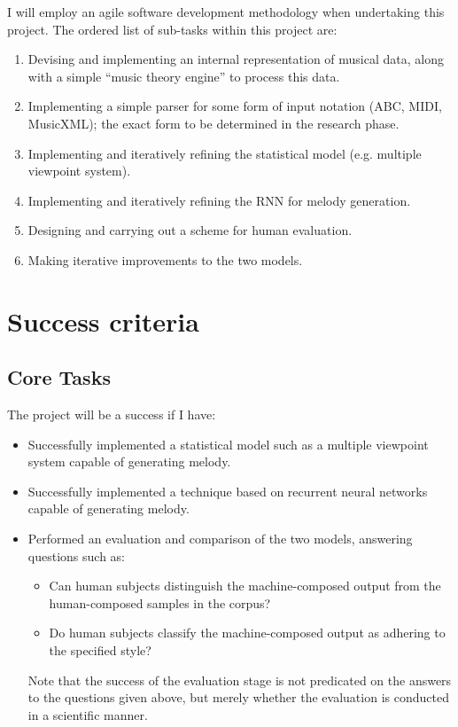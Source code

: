 \documentclass[12pt,a4paper,twoside]{article}
\begin{document}
I will employ an agile software development methodology when undertaking this
project. The ordered list of sub-tasks within this project are:
\begin{enumerate}

\item Devising and implementing an internal representation of musical data,
	along with a simple ``music theory engine'' to process this data.  

\item Implementing a simple parser for some form of input notation (ABC, MIDI,
	MusicXML); the exact form to be determined in the research phase.  

\item Implementing and iteratively refining the statistical model (e.g. multiple
	viewpoint system).

\item Implementing and iteratively refining the RNN for melody generation.  

\item Designing and carrying out a scheme for human evaluation.

\item Making iterative improvements to the two models.

\end{enumerate}

\section*{Success criteria}

\subsection*{Core Tasks}

The project will be a success if I have:
\begin{itemize}
	\item Successfully implemented a statistical model such as a multiple
		viewpoint system capable of generating melody.
	\item Successfully implemented a technique based on recurrent neural
		networks capable of generating melody.
	\item Performed an evaluation and comparison of the two
		models, answering questions such as:
	\begin{itemize}
		\item Can human subjects distinguish the machine-composed output
			from the human-composed samples in the corpus?
		\item Do human subjects classify the machine-composed output as
			adhering to the specified style?
	\end{itemize}

	Note that the success of the evaluation stage is not predicated on the
	answers to the questions given above, but merely whether the evaluation
	is conducted in a scientific manner.
\end{itemize}
\end{document}
